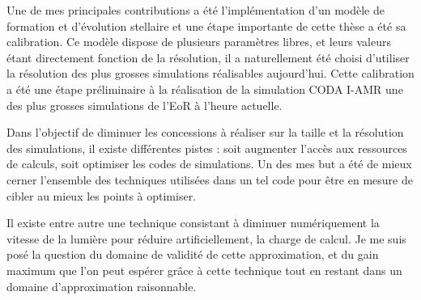 Une de mes principales contributions a été l'implémentation d'un modèle de formation et d'évolution stellaire et une étape importante de cette thèse a été sa calibration.
Ce modèle dispose de plusieurs paramètres libres, et leurs valeurs étant directement fonction de la résolution, il a naturellement été choisi d'utiliser la résolution des plus grosses simulations réalisables aujourd'hui.
Cette calibration a été une étape préliminaire à la réalisation de la simulation CODA I-AMR une des plus grosses simulations de l'\ac{EoR} à l'heure actuelle.


Dans l'objectif de diminuer les concessions à réaliser sur la taille et la résolution des simulations, il existe différentes pistes : soit augmenter l'accès aux ressources de calculs, soit optimiser les codes de simulations.
Un des mes but a été de mieux cerner l'ensemble des techniques utilisées dans un tel code pour être en mesure de cibler au mieux les points à optimiser.

Il existe entre autre une technique consistant à diminuer numériquement la vitesse de la lumière pour réduire artificiellement, la charge de calcul.
Je me suis posé la question du domaine de validité de cette approximation, et du gain maximum que l'on peut espérer grâce à cette technique tout en restant dans un domaine d'approximation raisonnable.

